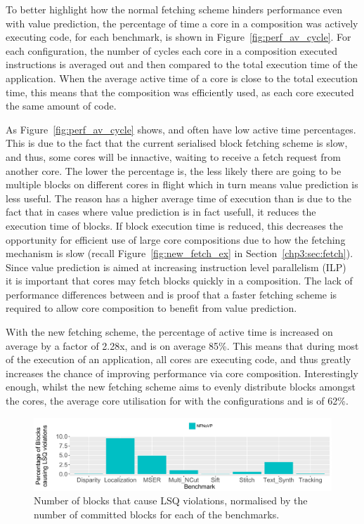 To better highlight how the normal fetching scheme hinders performance even with value prediction, the percentage of time a core in a composition was actively executing code, for each benchmark, is shown in Figure~\ref{fig:perf_av_cycle}.
For each configuration, the number of cycles each core in a composition executed instructions is averaged out and then compared to the total execution time of the application.
When the average active time of a core is close to the total execution time, this means that the composition was efficiently used, as each core executed the same amount of code.

As Figure~\ref{fig:perf_av_cycle} shows, \novp{} and \vp{} often have low active time percentages.
This is due to the fact that the current serialised block fetching scheme is slow, and thus, some cores will be innactive, waiting to receive a fetch request from another core.
The lower the percentage is, the less likely there are going to be multiple blocks on different cores in flight which in turn means value prediction is less useful.
The reason \novp{} has a higher average time of execution than \vp{} is due to the fact that in cases where value prediction is in fact usefull, it reduces the execution time of blocks.
If block execution time is reduced, this decreases the opportunity for efficient use of large core compositions due to how the fetching mechanism is slow (recall Figure~\ref{fig:new_fetch_ex} in Section~\ref{chp3:sec:fetch}).
Since value prediction is aimed at increasing instruction level parallelism (ILP)~\cite{peraisBeBop2015} it is important that cores may fetch blocks quickly in a composition.
The lack of performance differences between \novp{} and \vp{} is proof that a faster fetching scheme is required to allow core composition to benefit from value prediction.

With the new fetching scheme, the percentage of active time is increased on average by a factor of 2.28x, and is on average 85\%.
This means that during most of the execution of an application, all cores are executing code, and thus greatly increases the chance of improving performance via core composition.
Interestingly enough, whilst the new fetching scheme aims to evenly distribute blocks amongst the cores, the average core utilisation for  with the configurations \nfnovp{} and \nfvp{} is of 62\%.

\begin{figure}[t]
    \centering
    \includegraphics[width=1\textwidth]{chapter3/graphics/lsq_violations.pdf}
    \caption{Number of blocks that cause LSQ violations, normalised by the number of committed blocks for each of the benchmarks.}
    \label{fig:lsqvio}
	\vspace{1em}
\end{figure}

